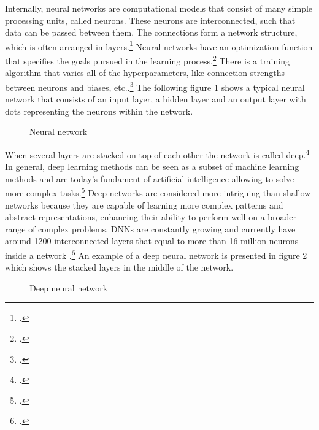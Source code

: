 Internally, neural networks are computational models that consist of many simple processing units, called neurons.
These neurons are interconnected, such that data can be passed between them.
The connections form a network structure, which is often arranged in layers.\footcite[cf.][305]{cichyDeepNeuralNetworks2019}
Neural networks have an optimization function that specifies the goals pursued in the learning process.\footcite[cf.][1583]{durstewitzDeepNeuralNetworks2019}
There is a training algorithm that varies all of the hyperparameters, like connection strengths between neurons and biases, etc..\footcite[cf.][1583]{durstewitzDeepNeuralNetworks2019}
The following figure 1 shows a typical neural network that consists of an input layer, a hidden layer and an output layer with dots representing the neurons within the network.
\begin{figure}[H]
    \centering
    \caption{Neural network}
\end{figure}
When several layers are stacked on top of each other the network is called deep.\footcite[cf.][305]{cichyDeepNeuralNetworks2019}
In general, deep learning methods can be seen as a subset of machine learning methods and are today's fundament of artificial intelligence allowing to solve more complex tasks.\footcite[cf.][1583]{durstewitzDeepNeuralNetworks2019}
Deep networks are considered more intriguing than shallow networks because they are capable of learning more complex patterns and abstract representations, enhancing their ability to perform well on a broader range of complex problems.
\ac{DNN}s are constantly growing and currently have around 1200 interconnected layers that equal to more than 16 million neurons inside a network .\footcite[cf.][2]{mallComprehensiveReviewDeep2023}
An example of a deep neural network is presented in figure 2 which shows the stacked layers in the middle of the network.
\begin{figure}[H]
    \centering
    \caption{Deep neural network}
\end{figure}

